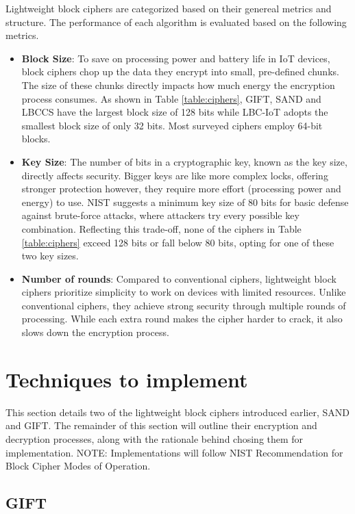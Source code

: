 \documentclass[conference]{IEEEtran}
\begin{document}
Lightweight block ciphers are categorized based on their genereal metrics and structure. The performance of each algorithm is evaluated based on the following metrics.
\begin{itemize}
    \item \textbf{Block Size}: To save on processing power and battery life in IoT devices, block ciphers chop up the data they encrypt into small, pre-defined chunks. The size of these chunks directly impacts how much energy the encryption process consumes. As shown in Table \ref{table:ciphers}, GIFT, SAND and LBCCS have the largest block size of 128 bits while LBC-IoT adopts the smallest block size of only 32 bits. Most surveyed ciphers employ 64-bit blocks.
    \item \textbf{Key Size}: The number of bits in a cryptographic key, known as the key size, directly affects security. Bigger keys are like more complex locks, offering stronger protection however, they require more effort (processing power and energy) to use. NIST suggests a minimum key size of 80 bits for basic defense against brute-force attacks, where attackers try every possible key combination\cite{barker2018transitioning}. Reflecting this trade-off, none of the ciphers in Table \ref{table:ciphers} exceed 128 bits or fall below 80 bits, opting for one of these two key sizes.
    \item \textbf{Number of rounds}: Compared to conventional ciphers, lightweight block ciphers prioritize simplicity to work on devices with limited resources. Unlike conventional ciphers, they achieve strong security through multiple rounds of processing. While each extra round makes the cipher harder to crack, it also slows down the encryption process.
\end{itemize}

\section{Techniques to implement}\label{sec:tec}

This section details two of the lightweight block ciphers introduced earlier, SAND and GIFT. The remainder of this section will outline their encryption and decryption processes, along with the rationale behind chosing them for implementation. NOTE: Implementations will follow NIST Recommendation for Block Cipher Modes of Operation\cite{dworkin2001recommendation}.

\subsection{GIFT}
\end{document}
